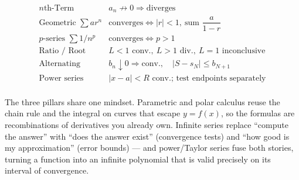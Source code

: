 \documentclass[11pt]{article}
\begin{document}
\begin{formulabox}
\renewcommand{\arraystretch}{1.6}
\[
\begin{array}{ll}
\text{$n$th-Term} & a_n\not\to0 \Rightarrow \text{diverges} \\
\text{Geometric } \sum ar^n & \text{converges} \Leftrightarrow |r|<1,\ \text{sum } \dfrac{a}{1-r} \\
\text{$p$-series } \sum 1/n^p & \text{converges} \Leftrightarrow p>1 \\
\text{Ratio / Root} & L<1 \text{ conv.},\ L>1 \text{ div.},\ L=1 \text{ inconclusive} \\
\text{Alternating} & b_n\downarrow0 \Rightarrow \text{conv.},\quad |S-s_N|\le b_{N+1} \\
\text{Power series} & |x-a|<R \text{ conv.; test endpoints separately} \\
\end{array}
\]
\end{formulabox}

\begin{conceptbox}
The three pillars share one mindset. Parametric and polar calculus reuse the
\textcolor{accentorange}{chain rule and the integral} on curves that escape $y=f(x)$,
so the formulas are recombinations of derivatives you already own. Infinite series
replace ``compute the answer'' with \textcolor{accentorange}{``does the answer
exist''} (convergence tests) and ``how good is my approximation'' (error bounds) ---
and power/Taylor series fuse both stories, turning a function into an
\textcolor{accentorange}{infinite polynomial} that is valid precisely on its interval
of convergence.
\end{conceptbox}
\end{document}
